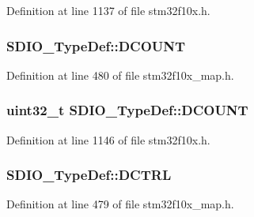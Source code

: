 Definition at line 1137 of file stm32f10x.\+h.

\subsubsection[{\texorpdfstring{D\+C\+O\+U\+NT}{DCOUNT}}]{ S\+D\+I\+O\+\_\+\+Type\+Def\+::\+D\+C\+O\+U\+NT}\hypertarget{struct_s_d_i_o___type_def_aacf827d1a330149c49b9ca256de47dda}{}\label{struct_s_d_i_o___type_def_aacf827d1a330149c49b9ca256de47dda}


Definition at line 480 of file stm32f10x\+\_\+map.\+h.

\subsubsection[{\texorpdfstring{D\+C\+O\+U\+NT}{DCOUNT}}]{ {\bf uint32\+\_\+t} S\+D\+I\+O\+\_\+\+Type\+Def\+::\+D\+C\+O\+U\+NT}\hypertarget{struct_s_d_i_o___type_def_a0366564e2795952d520c0de4be70020f}{}\label{struct_s_d_i_o___type_def_a0366564e2795952d520c0de4be70020f}


Definition at line 1146 of file stm32f10x.\+h.

\subsubsection[{\texorpdfstring{D\+C\+T\+RL}{DCTRL}}]{ S\+D\+I\+O\+\_\+\+Type\+Def\+::\+D\+C\+T\+RL}\hypertarget{struct_s_d_i_o___type_def_a049beb4d94059a62e3f7a548a87e4c9c}{}\label{struct_s_d_i_o___type_def_a049beb4d94059a62e3f7a548a87e4c9c}


Definition at line 479 of file stm32f10x\+\_\+map.\+h.


